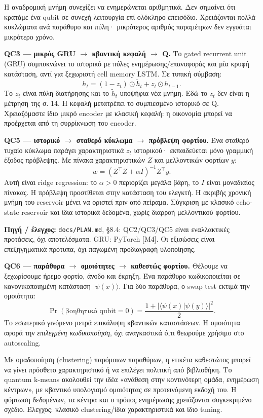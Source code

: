 \documentclass[11pt,a4paper]{article}
\newcommand{\page}[2]{\clearpage\pdfbookmark[0]{#1}{topic\thepage}{\sffamily\color{ink}\LARGE #1\par}\vspace{3pt}{\sffamily\large #2\par}\vspace{8pt}}
\newcommand{\src}[1]{\vfill{\footnotesize\color{ink}\textbf{Πηγή / έλεγχος:} #1\par}}
\newcommand{\code}[1]{{\footnotesize\nolinkurl{#1}}}
\newcommand{\ket}[1]{\lvert #1\rangle}
\begin{document}
Η αναδρομική μνήμη συνεχίζει να ενημερώνεται αριθμητικά. Δεν σημαίνει ότι κρατάμε ένα qubit σε συνεχή λειτουργία επί ολόκληρο επεισόδιο. Χρειάζονται πολλά κυκλώματα ανά παράθυρο και πύλη· μικρότερος αριθμός παραμέτρων δεν εγγυάται μικρότερο χρόνο.

\textbf{QC3 — μικρός GRU \ensuremath{\rightarrow} κβαντική κεφαλή \ensuremath{\rightarrow} Q.} Το gated recurrent unit (GRU) συμπυκνώνει το ιστορικό με πύλες ενημέρωσης/επαναφοράς και μία κρυφή κατάσταση, αντί για ξεχωριστή cell memory LSTM. Σε τυπική σύμβαση:
\[
 h_t=(1-z_t)\odot\widetilde h_t+z_t\odot h_{t-1}.
\]
Το $z_t$ είναι πύλη διατήρησης και το $\widetilde h_t$ υποψήφια νέα μνήμη. Εδώ το $z_t$ δεν είναι η μέτρηση της σ. 14. Η κεφαλή μετατρέπει το συμπιεσμένο ιστορικό σε Q. Χρειαζόμαστε ίδιο μικρό encoder με κλασική κεφαλή: η οικονομία μπορεί να προέρχεται από τη συρρίκνωση του encoder.

\textbf{QC5 — ιστορικό \ensuremath{\rightarrow} σταθερό κύκλωμα \ensuremath{\rightarrow} πρόβλεψη φορτίου.} Ένα σταθερό τυχαίο κύκλωμα παράγει χαρακτηριστικά $z_t$ ιστορικού· εκπαιδεύεται μόνο γραμμική έξοδος πρόβλεψης. Με πίνακα χαρακτηριστικών $Z$ και μελλοντικών φορτίων $y$:
\[
 w=(Z^\top Z+\alpha I)^{-1}Z^\top y.
\]
Αυτή είναι ridge regression: το $\alpha>0$ περιορίζει μεγάλα βάρη, το $I$ είναι μοναδιαίος πίνακας. Η πρόβλεψη προστίθεται στην κατάσταση του ελεγκτή. Η ακριβής χρονική μνήμη του reservoir μένει να οριστεί πριν από πείραμα. Σύγκριση με κλασικό echo-state reservoir και ίδια ιστορικά δεδομένα, χωρίς διαρροή μελλοντικού φορτίου.
\src{\code{docs/PLAN.md}, §8.4: QC2/QC3/QC5 είναι εναλλακτικές προτάσεις, όχι αποτελέσματα. GRU: PyTorch [Μ4]. Οι εξισώσεις είναι επεξηγηματικά πρότυπα, όχι παγωμένη προδιαγραφή υλοποίησης.}

\page{17 · QC6 και QC7}{Ομοιότητα παραθύρων και προσοχή}
\textbf{QC6 — παράθυρα \ensuremath{\rightarrow} ομοιότητες \ensuremath{\rightarrow} καθεστώς φορτίου.} Θέλουμε να ξεχωρίσουμε ήρεμο φορτίο, άνοδο και έκρηξη. Ένα παράθυρο κωδικοποιείται σε κανονικοποιημένη κατάσταση $\ket{\psi(x)}$. Για δύο παράθυρα, ο swap test εκτιμά την ομοιότητα:
\[
 \Pr(\text{βοηθητικό qubit}=0)
 =\frac{1+|\langle\psi(x)|\psi(y)\rangle|^2}{2}.
\]
Το εσωτερικό γινόμενο μετρά επικάλυψη κβαντικών καταστάσεων. Η ομοιότητα αφορά την \emph{επιλεγμένη κωδικοποίηση}, όχι αναγκαστικά ό,τι θεωρούμε χρήσιμο στο autoscaling.

Με ομαδοποίηση (clustering) παρόμοιων παραθύρων, η ετικέτα καθεστώτος μπορεί να γίνει πρόσθετο χαρακτηριστικό ή να επιλέγει πολιτική από βιβλιοθήκη. Το quantum k-means ακολουθεί την ιδέα «ανάθεση στην κοντινότερη ομάδα, ενημέρωση κέντρων», με κβαντικό υπολογισμό ομοιότητας σε προτεινόμενη εκδοχή του. Η φόρτωση δεδομένων, τα κέντρα και ο τρόπος ενημέρωσης χρειάζονται συγκεκριμένο σχέδιο. Έλεγχος: κλασικό clustering/ίδια χαρακτηριστικά και ίδιο tuning.
\end{document}
